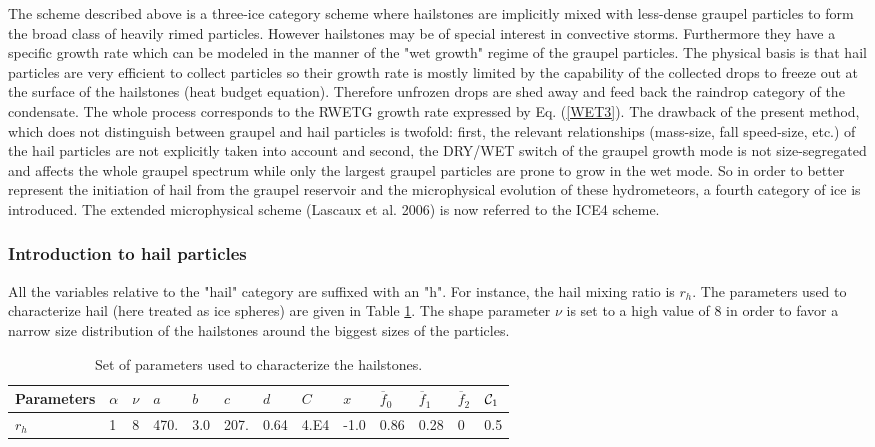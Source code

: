 The scheme described above is a three-ice category scheme where hailstones
are implicitly mixed with less-dense graupel particles to form the broad class
of heavily rimed particles. However hailstones may be of special interest in
convective storms. Furthermore they have a specific growth rate which can be
modeled in the manner of the "wet growth" regime of the graupel particles. The
physical basis is that hail particles are very efficient to collect particles
so their growth rate is mostly limited by the capability of the collected drops
to freeze out at the surface of the hailstones (heat budget equation).
Therefore unfrozen drops are shed away and feed back the raindrop category of
the condensate. The whole process corresponds to the RWETG growth rate
expressed by Eq. (\ref{WET3}). The drawback of the present method, which does
not distinguish between graupel and hail particles is twofold: first, the
relevant relationships (mass-size, fall speed-size, etc.) of the hail
particles are not explicitly taken into account and second, the DRY/WET switch
of the graupel growth mode is not size-segregated and affects the whole graupel
spectrum while only the largest graupel particles are prone to grow in the wet
mode. So in order to better represent the initiation of hail from the graupel
reservoir and the microphysical evolution of these hydrometeors, a fourth
category of ice is introduced. The extended microphysical scheme (Lascaux et al. 2006)
is now referred to the ICE4 scheme.

%
\subsubsection{Introduction to hail particles}
%

All the variables relative to the "hail" category are suffixed with an "h".
For instance, the hail mixing ratio is $r_h$. The parameters used to
characterize hail (here treated as ice spheres) are given in
Table \ref{table2_hail}. The shape parameter $\nu$ is set to a high value of 8
in order to favor a narrow size distribution of the hailstones
around the biggest sizes of the particles.

\begin{table}[!ht]
\caption{Set of parameters used to characterize the hailstones.}
\begin{center}\label{table2_hail}
\begin{tabular}{|l||l|l|l|l|l|l|l|l|l|l|l|l|}
\hline
Parameters & $\alpha$ & $\nu$ & $a$ & $b$ & $c$ & $d$ & $C$ & $x$ & $\overline{f}_0$ & $\overline{f}_1$ & $\overline{f}_2$ & ${\cal C}_{1}$ \\
\hline \hline 
$r_h$ & 1 & 8 & 470. & 3.0 & 207. & 0.64 & 4.E4 & -1.0 & 0.86 & 0.28 & 0 & 0.5 \\
\hline
\end{tabular}
\end{center}
\end{table}
%
